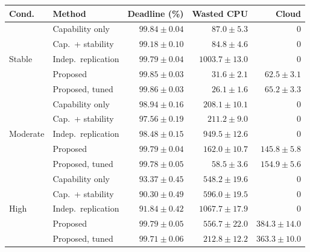\begin{tabular}{@{}llrrr@{}}
\toprule
Cond. & Method & Deadline (\%) & Wasted CPU & Cloud \\
\midrule
 \multirow{5}{*}{Stable} & Capability only & $99.84 \pm 0.04$ & $87.0 \pm 5.3$ & 0 \\
  & Cap.\ + stability & $99.18 \pm 0.10$ & $84.8 \pm 4.6$ & 0 \\
  & Indep.\ replication & $99.79 \pm 0.04$ & $1003.7 \pm 13.0$ & 0 \\
  & Proposed & $99.85 \pm 0.03$ & $31.6 \pm 2.1$ & $62.5 \pm 3.1$ \\
  & Proposed, tuned & $99.86 \pm 0.03$ & $26.1 \pm 1.6$ & $65.2 \pm 3.3$ \\
\midrule
 \multirow{5}{*}{Moderate} & Capability only & $98.94 \pm 0.16$ & $208.1 \pm 10.1$ & 0 \\
  & Cap.\ + stability & $97.56 \pm 0.19$ & $211.2 \pm 9.0$ & 0 \\
  & Indep.\ replication & $98.48 \pm 0.15$ & $949.5 \pm 12.6$ & 0 \\
  & Proposed & $99.79 \pm 0.04$ & $162.0 \pm 10.7$ & $145.8 \pm 5.8$ \\
  & Proposed, tuned & $99.78 \pm 0.05$ & $58.5 \pm 3.6$ & $154.9 \pm 5.6$ \\
\midrule
 \multirow{5}{*}{High} & Capability only & $93.37 \pm 0.45$ & $548.2 \pm 19.6$ & 0 \\
  & Cap.\ + stability & $90.30 \pm 0.49$ & $596.0 \pm 19.5$ & 0 \\
  & Indep.\ replication & $91.84 \pm 0.42$ & $1067.7 \pm 17.9$ & 0 \\
  & Proposed & $99.79 \pm 0.05$ & $556.7 \pm 22.0$ & $384.3 \pm 14.0$ \\
  & Proposed, tuned & $99.71 \pm 0.06$ & $212.8 \pm 12.2$ & $363.3 \pm 10.0$ \\
\bottomrule
\end{tabular}
